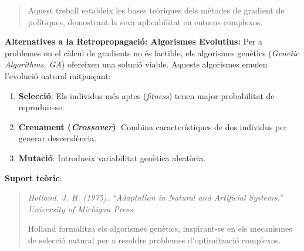 \begin{enumerate}
\begin{enumerate}
\begin{enumerate}
\begin{quote}
           Aquest treball estableix les bases teòriques dels mètodes de gradient de polítiques, demostrant la seva aplicabilitat en entorns complexos.
           \end{quote}
           \textbf{Alternatives a la Retropropagació: Algorismes Evolutius:} Per a problemes on el càlcul de gradients no és factible, els algorismes genètics (\textit{Genetic Algorithms, GA}) ofereixen una solució viable. Aquests algorismes emulen l'evolució natural mitjançant:
               \begin{enumerate}
                \item \textbf{Selecció}: Els individus més aptes (\textit{fitness}) tenen major probabilitat de reproduir-se.

                \item \textbf{Creuament (\textit{Crossover})}: Combina característiques de dos individus per generar descendència.

                \item \textbf{Mutació}: Introdueix variabilitat genètica aleatòria.
               \end{enumerate}
           \textbf{Suport teòric}:
           \begin{quote}
           \textit{Holland, J. H. (1975). ``Adaptation in Natural and Artificial Systems.'' University of Michigan Press.}

           Holland formalitza els algorismes genètics, inspirant-se en els mecanismes de selecció natural per a resoldre problemes d'optimització complexos.
           \end{quote}

     \end{enumerate}


\end{enumerate}
\end{enumerate}
